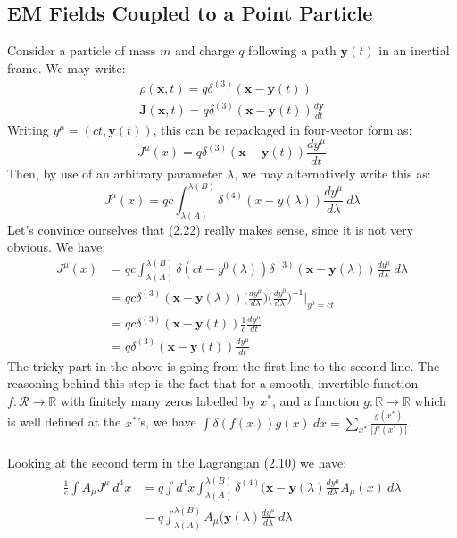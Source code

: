\documentclass[a4paper]{article}
\numberwithin{equation}{section}
\begin{document}
\subsection{EM Fields Coupled to a Point Particle}
Consider a particle of mass $m$ and charge $q$ following a path $\mathbf{y}(t)$ in an inertial frame. We may write:
\begin{align}
\rho(\mathbf{x},t)=q \delta^{(3)}(\mathbf{x}-\mathbf{y}(t)) \\
\mathbf{J}(\mathbf{x},t)=q\delta^{(3)}(\mathbf{x}-\mathbf{y}(t))\frac{d \mathbf{y}}{dt}
\end{align}
Writing $y^\mu = (ct, \mathbf{y}(t))$, this can be repackaged in four-vector form as:
\begin{equation}
J^\mu (x)=q\delta^{(3)}(\mathbf{x}-\mathbf{y}(t))\frac{dy^\mu}{dt}
\end{equation}
Then, by use of an arbitrary parameter $\lambda$, we may alternatively write this as:
\begin{equation} \label{particle4current}
J^\mu(x)=qc \int_{\lambda(A)}^{\lambda(B)}\delta^{(4)}(x-y(\lambda))\frac{dy^\mu}{d\lambda} \ d\lambda
\end{equation}
Let's convince ourselves that (2.22) really makes sense, since it is not very obvious. We have:
\begin{align*}
J^\mu(x) &= qc\int_{\lambda(A)}^{\lambda{(B)}} \delta(ct-y^0(\lambda))\delta^{(3)}(\mathbf{x}-\mathbf{y}(\lambda))\frac{dy^\mu}{d \lambda} \ d \lambda \\
&= qc \delta^{(3)}(\mathbf{x}-\mathbf{y}(\lambda))\bigg(\frac{dy^\mu}{d\lambda} \bigg)\bigg(\frac{dy^0}{d\lambda} \bigg)^{-1}\bigg \vert_{y^0=ct} \\
&=qc\delta^{(3)}(\mathbf{x}-\mathbf{y}(t)) \frac{1}{c} \frac{dy^\mu}{dt} \\
&=q\delta^{(3)}(\mathbf{x}-\mathbf{y}(t))\frac{dy^\mu}{dt}
\end{align*}
The tricky part in the above is going from the first line to the second line. The reasoning behind this step is the fact that for a smooth, invertible function $f:\mathcal{R} \rightarrow \mathbb{R}$ with finitely many zeros labelled by $x^*$, and a function $g:\mathbb{R} \rightarrow \mathbb{R}$ which is well defined at the $x^*$'s, we have $\int \delta(f(x))g(x) \ dx = \sum_{x^*} \frac{g(x^*)}{|f'(x^*)|}$.\\
\\
Looking at the second term in the Lagrangian (2.10) we have:
\begin{align}
\begin{split}
\frac{1}{c}\int A_\mu J^\mu \ d^4x &= q\int d^4x \int_{\lambda(A)}^{\lambda(B)}\delta^{(4)}(\mathbf{x}-\mathbf{y}(\lambda)\frac{d y^\mu}{d\lambda}A_\mu(x) \ d\lambda \\
&=q\int_{\lambda(A)}^{\lambda(B)}A_\mu(\mathbf{y}(\lambda)\frac{d y^\mu}{d\lambda} \ d\lambda 
\end{split}
\end{align}
\end{document}
